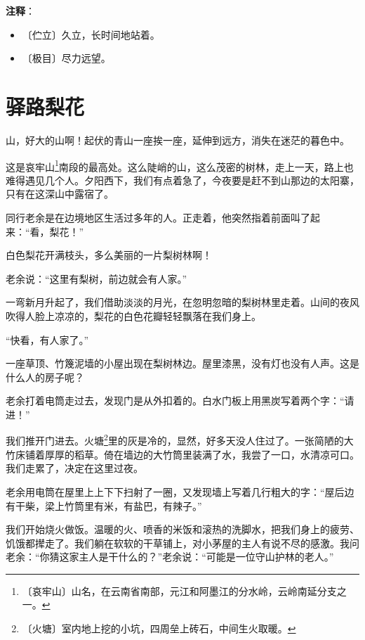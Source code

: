 \documentclass[12pt,UTF-8,openany]{ctexbook}
\begin{document}
\newpage

\textbf{注释}：

\vspace{-1em}

\begin{itemize}
    \setlength\itemsep{-0.2em}
    \item 〔伫立〕久立，长时间地站着。
    \item 〔极目〕尽力远望。
\end{itemize}

\chapter{驿路梨花}

\begin{normalsize}
    
    山，好大的山啊！起伏的青山一座挨一座，延伸到远方，消失在迷茫的暮色中。
    
    这是哀牢山\footnote{〔哀牢山〕山名，在云南省南部，元江和阿墨江的分水岭，云岭南延分支之一。}南段的最高处。这么陡峭的山，这么茂密的树林，走上一天，路上也难得遇见几个人。夕阳西下，我们有点着急了，今夜要是赶不到山那边的太阳寨，只有在这深山中露宿了。
    
    同行老余是在边境地区生活过多年的人。正走着，他突然指着前面叫了起来：“看，梨花！”
    
    白色梨花开满枝头，多么美丽的一片梨树林啊！
    
    老余说：“这里有梨树，前边就会有人家。”
    
    一弯新月升起了，我们借助淡淡的月光，在忽明忽暗的梨树林里走着。山间的夜风吹得人脸上凉凉的，梨花的白色花瓣轻轻飘落在我们身上。
    
    “快看，有人家了。”
    
    一座草顶、竹篾泥墙的小屋出现在梨树林边。屋里漆黑，没有灯也没有人声。这是什么人的房子呢？
    
    老余打着电筒走过去，发现门是从外扣着的。白水门板上用黑炭写着两个字：“请进！”
    
    我们推开门进去。火塘\footnote{〔火塘〕室内地上挖的小坑，四周垒上砖石，中间生火取暖。}里的灰是冷的，显然，好多天没人住过了。一张简陋的大竹床铺着厚厚的稻草。倚在墙边的大竹筒里装满了水，我尝了一口，水清凉可口。我们走累了，决定在这里过夜。
    
    老余用电筒在屋里上上下下扫射了一圈，又发现墙上写着几行粗大的字：“屋后边有干柴，梁上竹筒里有米，有盐巴，有辣子。”
    
    我们开始烧火做饭。温暖的火、喷香的米饭和滚热的洗脚水，把我们身上的疲劳、饥饿都撵走了。我们躺在软软的干草铺上，对小茅屋的主人有说不尽的感激。我问老余：“你猜这家主人是干什么的？”老余说：“可能是一位守山护林的老人。”
    

\end{normalsize}
\end{document}
